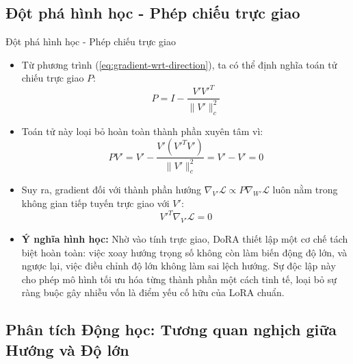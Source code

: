 \documentclass[11pt,aspectratio=169]{beamer}
\begin{document}
\subsection{Đột phá hình học - Phép chiếu trực giao}
\begin{frame}[t]{Đột phá hình học - Phép chiếu trực giao}
\scriptsize
\begin{itemize}
    \item Từ phương trình (\ref{eq:gradient-wrt-direction}), ta có thể định nghĩa toán tử chiếu trực giao $P$:
    $$P = I - \frac{V'V'^T}{\|V'\|_c^{2}}$$
    \item Toán tử này loại bỏ hoàn toàn thành phần xuyên tâm vì:
    $$PV' = V' - \frac{V'(V'^T V')}{\|V'\|_c^{2}} = V' - V' = 0$$
    \item Suy ra, gradient đối với thành phần hướng $\nabla_{V'}\mathcal{L} \propto P \nabla_{W'}\mathcal{L}$ luôn nằm trong không gian tiếp tuyến trực giao với $V'$:
    $$V'^T \nabla_{V'}\mathcal{L}=0$$
    \item \textbf{Ý nghĩa hình học:} Nhờ vào tính trực giao, DoRA thiết lập một cơ chế tách biệt hoàn toàn: việc xoay hướng trọng số không còn làm biến động độ lớn, và ngược lại, việc điều chỉnh độ lớn không làm sai lệch hướng. Sự độc lập này cho phép mô hình tối ưu hóa từng thành phần một cách tinh tế, loại bỏ sự ràng buộc gây nhiễu vốn là điểm yếu cố hữu của LoRA chuẩn.
\end{itemize}
\end{frame}


\subsection{Phân tích Động học: Tương quan nghịch giữa Hướng và Độ lớn}
\end{document}
